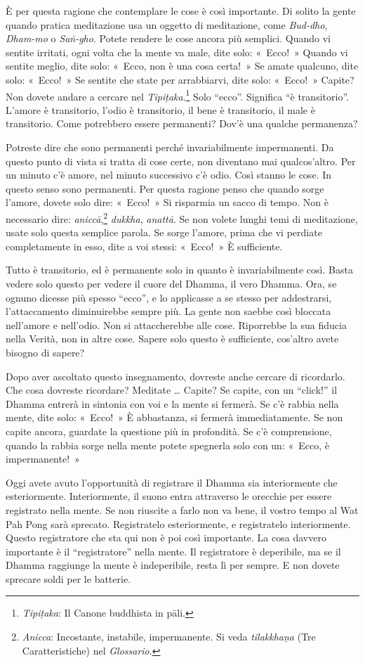 È per questa ragione che contemplare le cose è così importante. Di
solito la gente quando pratica meditazione usa un oggetto di
meditazione, come \emph{Bud-dho}, \emph{Dham-mo} o \emph{Saṅ-gho}.
Potete rendere le cose ancora più semplici. Quando vi sentite irritati,
ogni volta che la mente va male, dite solo: «~Ecco!~» Quando vi sentite
meglio, dite solo: «~Ecco, non è una cosa certa!~» Se amate qualcuno,
dite solo: «~Ecco!~» Se sentite che state per arrabbiarvi, dite solo:
«~Ecco!~» Capite? Non dovete andare a cercare nel
\emph{Tipiṭaka}.\footnote{\emph{Tipiṭaka}: Il Canone buddhista in pāli.}
Solo ``ecco''. Significa ``è transitorio''. L'amore è transitorio,
l'odio è transitorio, il bene è transitorio, il male è transitorio. Come
potrebbero essere permanenti? Dov'è una qualche permanenza?

Potreste dire che sono permanenti perché invariabilmente impermanenti.
Da questo punto di vista si tratta di cose certe, non diventano mai
qualcos'altro. Per un minuto c'è amore, nel minuto successivo c'è odio.
Così stanno le cose. In questo senso sono permanenti. Per questa ragione
penso che quando sorge l'amore, dovete solo dire: «~Ecco!~» Si risparmia
un sacco di tempo. Non è necessario dire: \emph{aniccā},\footnote{\emph{Anicca}:
  Incostante, instabile, impermanente. Si veda \emph{tilakkhaṇa} (Tre
  Caratteristiche) nel \emph{Glossario}.} \emph{dukkha}, \emph{anattā}.
Se non volete lunghi temi di meditazione, usate solo questa semplice
parola. Se sorge l'amore, prima che vi perdiate completamente in esso,
dite a voi stessi: «~Ecco!~» È sufficiente.

Tutto è transitorio, ed è permanente solo in quanto è invariabilmente
così. Basta vedere solo questo per vedere il cuore del Dhamma, il vero
Dhamma. Ora, se ognuno dicesse più spesso ``ecco'', e lo applicasse a se
stesso per addestrarsi, l'attaccamento diminuirebbe sempre più. La gente
non saebbe così bloccata nell'amore e nell'odio. Non si attaccherebbe
alle cose. Riporrebbe la sua fiducia nella Verità, non in altre cose.
Sapere solo questo è sufficiente, cos'altro avete bisogno di sapere?

Dopo aver ascoltato questo insegnamento, dovreste anche cercare di
ricordarlo. Che cosa dovreste ricordare? Meditate \ldots{} Capite? Se capite,
con un ``click!'' il Dhamma entrerà in sintonia con voi e la mente si
fermerà. Se c'è rabbia nella mente, dite solo: «~Ecco!~» È abbastanza,
si fermerà immediatamente. Se non capite ancora, guardate la questione
più in profondità. Se c'è comprensione, quando la rabbia sorge nella
mente potete spegnerla solo con un: «~Ecco, è impermanente!~»

Oggi avete avuto l'opportunità di registrare il Dhamma sia interiormente
che esteriormente. Interiormente, il suono entra attraverso le orecchie
per essere registrato nella mente. Se non riuscite a farlo non va bene,
il vostro tempo al Wat Pah Pong sarà sprecato. Registratelo
esteriormente, e registratelo interiormente. Questo registratore che sta
qui non è poi così importante. La cosa davvero importante è il
``registratore'' nella mente. Il registratore è deperibile, ma se il
Dhamma raggiunge la mente è indeperibile, resta lì per sempre. E non
dovete sprecare soldi per le batterie.

